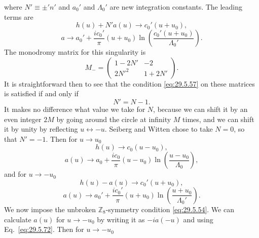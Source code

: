 where \(N'\equiv\mathord{\pm}'n'\) and \(a_0'\) and \(\Lambda_0'\) are new
integration constants. The leading terms are
\begin{equation}
  h(u)+N'a(u)\longrightarrow c_0'(u+u_0),
  \tag{29.5.67}\label{eq:29.5.67}
\end{equation}
\begin{equation}
  a\longrightarrow a_0'
  +\frac{ic_0'}{\pi}(u+u_0)
  \ln\left(\frac{c_0'(u+u_0)}{\Lambda_0'}\right).
  \tag{29.5.68}\label{eq:29.5.68}
\end{equation}
The monodromy matrix for this singularity is
\begin{equation}
  M_-=
  \begin{pmatrix}
    1-2N'&-2\\
    2N'^2&1+2N'
  \end{pmatrix}.
  \tag{29.5.69}\label{eq:29.5.69}
\end{equation}
It is straightforward then to see that the condition \eqref{eq:29.5.57} on
these matrices is satisfied if and only if
\begin{equation}
  N'=N-1.
  \tag{29.5.70}\label{eq:29.5.70}
\end{equation}
It makes no difference what value we take for \(N\), because we can shift it
by an even integer \(2M\) by going around the circle at infinity \(M\) times,
and we can shift it by unity by reflecting \(u\longleftrightarrow-u\).
Seiberg and Witten chose to take \(N=0\), so that \(N'=-1\). Then for
\(u\longrightarrow u_0\)
\begin{equation}
  h(u)\longrightarrow c_0(u-u_0),
  \tag{29.5.71}\label{eq:29.5.71}
\end{equation}
\begin{equation}
  a(u)\longrightarrow a_0+\frac{ic_0}{\pi}(u-u_0)
  \ln\left(\frac{u-u_0}{\Lambda_0}\right),
  \tag{29.5.72}\label{eq:29.5.72}
\end{equation}
and for \(u\longrightarrow-u_0\)
\begin{equation}
  h(u)-a(u)\longrightarrow c_0'(u+u_0),
  \tag{29.5.73}\label{eq:29.5.73}
\end{equation}
\begin{equation}
  a(u)\longrightarrow a_0'
  +\frac{ic_0'}{\pi}(u+u_0)
  \ln\left(\frac{u+u_0}{\Lambda_0'}\right).
  \tag{29.5.74}\label{eq:29.5.74}
\end{equation}
We now impose the unbroken \(\mathbb{Z}_8\)-symmetry condition
\eqref{eq:29.5.54}. We can calculate \(a(u)\) for
\(u\longrightarrow-u_0\) by writing it as \(-ia(-u)\) and using
Eq.~\eqref{eq:29.5.72}. Then for \(u\longrightarrow-u_0\)
